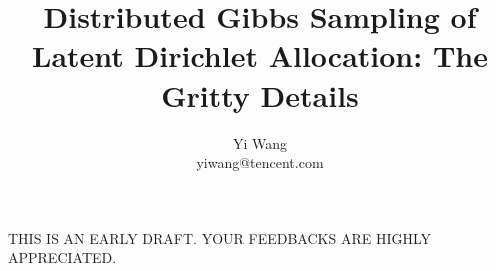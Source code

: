 \documentclass[a4paper]{article}
\begin{document}
\title{Distributed Gibbs Sampling of Latent Dirichlet Allocation: The
  Gritty Details}

\author{Yi Wang\\yiwang@tencent.com}
\date{}

\maketitle
%
THIS IS AN EARLY DRAFT.  YOUR FEEDBACKS ARE HIGHLY APPRECIATED.






\end{document}
